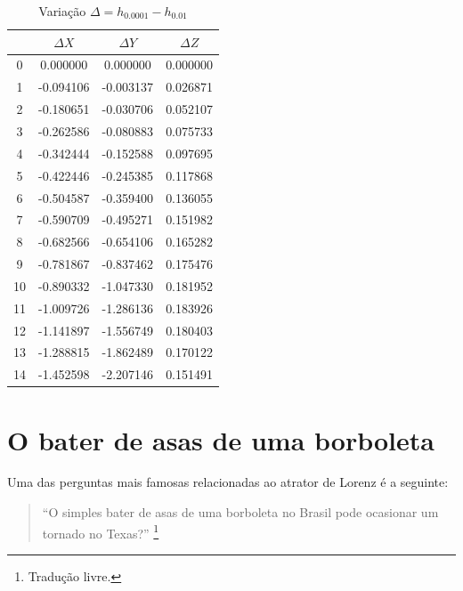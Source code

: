 \documentclass[12pt, a4paper]{article}
\begin{document}
    \begin{table}[H]
        \centering
        \footnotesize
        \begin{tabular}{|c|c|c|c|}
        \toprule
        & $\Delta X$ & $\Delta Y$ & $\Delta Z$ \\
        \midrule
        0 & 0.000000 & 0.000000 & 0.000000 \\
        1 & -0.094106 & -0.003137 & 0.026871 \\
        2 & -0.180651 & -0.030706 & 0.052107 \\
        3 & -0.262586 & -0.080883 & 0.075733 \\
        4 & -0.342444 & -0.152588 & 0.097695 \\
        5 & -0.422446 & -0.245385 & 0.117868 \\
        6 & -0.504587 & -0.359400 & 0.136055 \\
        7 & -0.590709 & -0.495271 & 0.151982 \\
        8 & -0.682566 & -0.654106 & 0.165282 \\
        9 & -0.781867 & -0.837462 & 0.175476 \\
        10 & -0.890332 & -1.047330 & 0.181952 \\
        11 & -1.009726 & -1.286136 & 0.183926 \\
        12 & -1.141897 & -1.556749 & 0.180403 \\
        13 & -1.288815 & -1.862489 & 0.170122 \\
        14 & -1.452598 & -2.207146 & 0.151491 \\
        \bottomrule
        \end{tabular}
        \caption{Variação $\Delta = h_{0.0001} - h_{0.01}$}
    \end{table}
    
    \newpage
    
    
    
    \appendix
    \section{O bater de asas de uma borboleta}
    
    Uma das perguntas mais famosas relacionadas ao atrator de Lorenz é a
    seguinte:
    
    \begin{quote}
        “O simples bater de asas de uma borboleta no Brasil pode ocasionar um
        tornado no Texas?” \footnote{Tradução livre.}
    \end{quote}
    
\end{document}
